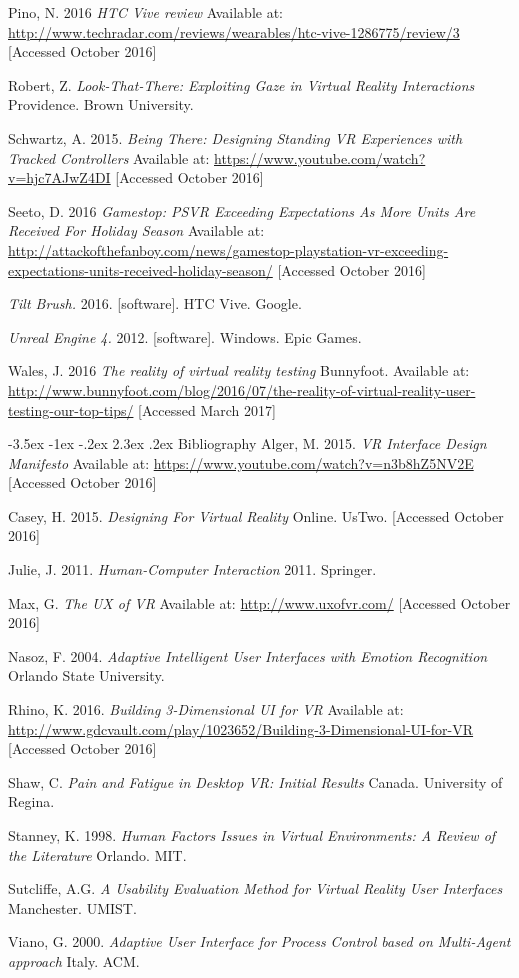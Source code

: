 \documentclass[12pt]{article}
\makeatletter
\renewcommand{\section}{\@startsection {section}{1}{\z@}%
             {-3.5ex \@plus -1ex \@minus -.2ex}%
             {2.3ex \@plus .2ex}%
             {\normalfont\Large\scshape\bfseries}}
\makeatother
\begin{document}
Pino, N. 2016 \emph{HTC Vive review} Available at: \url{http://www.techradar.com/reviews/wearables/htc-vive-1286775/review/3} [Accessed October 2016]

Robert, Z. \emph{Look-That-There: Exploiting Gaze in Virtual Reality Interactions} Providence. Brown University. 

Schwartz, A. 2015. \emph{Being There: Designing Standing VR Experiences with Tracked Controllers} Available at: \url{https://www.youtube.com/watch?v=hjc7AJwZ4DI} [Accessed October 2016]

Seeto, D. 2016 \emph{Gamestop: PSVR Exceeding Expectations As More Units Are Received For Holiday Season} Available at: \url{http://attackofthefanboy.com/news/gamestop-playstation-vr-exceeding-expectations-units-received-holiday-season/} [Accessed October 2016]

\emph{Tilt Brush.} 2016. [software]. HTC Vive. Google. 

\emph{Unreal Engine 4.} 2012. [software]. Windows. Epic Games. 

Wales, J. 2016 \emph{The reality of virtual reality testing} Bunnyfoot. Available at: \url{http://www.bunnyfoot.com/blog/2016/07/the-reality-of-virtual-reality-user-testing-our-top-tips/} [Accessed March 2017]


\section{Bibliography}
Alger, M. 2015. \emph{VR Interface Design Manifesto} Available at: \url{https://www.youtube.com/watch?v=n3b8hZ5NV2E} [Accessed October 2016]

Casey, H. 2015. \emph{Designing For Virtual Reality} Online. UsTwo. [Accessed October 2016]

Julie, J. 2011. \emph{Human-Computer Interaction} 2011. Springer. 

Max, G. \emph{The UX of VR} Available at: \url{http://www.uxofvr.com/} [Accessed October 2016]

Nasoz, F. 2004. \emph{Adaptive Intelligent User Interfaces with Emotion Recognition} Orlando State University. 

Rhino, K. 2016. \emph{Building 3-Dimensional UI for VR} Available at: \url{http://www.gdcvault.com/play/1023652/Building-3-Dimensional-UI-for-VR} [Accessed October 2016]

Shaw, C. \emph{Pain and Fatigue in Desktop VR: Initial Results} Canada. University of Regina. 

Stanney, K. 1998. \emph{Human Factors Issues in Virtual Environments: A Review of the Literature} Orlando. MIT. 

Sutcliffe, A.G. \emph{A Usability Evaluation Method for Virtual Reality User Interfaces} Manchester. UMIST. 

Viano, G. 2000. \emph{Adaptive User Interface for Process Control based on Multi-Agent approach} Italy. ACM. 
\end{document}
